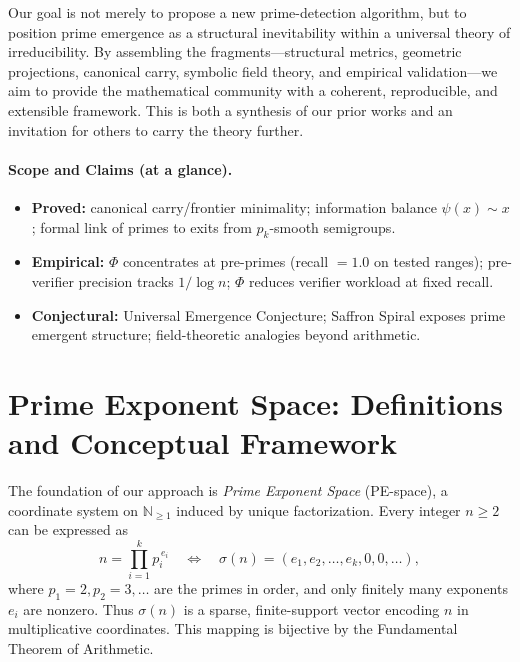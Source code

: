 \documentclass[11pt]{article}
\theoremstyle{plain}
\theoremstyle{definition}
\newcommand{\N}{\mathbb{N}}
\begin{document}
Our goal is not merely to propose a new prime-detection algorithm, but to position prime emergence as a structural inevitability within a universal theory of irreducibility. By assembling the fragments—structural metrics, geometric projections, canonical carry, symbolic field theory, and empirical validation—we aim to provide the mathematical community with a coherent, reproducible, and extensible framework. This is both a synthesis of our prior works and an invitation for others to carry the theory further.

\paragraph{Scope and Claims (at a glance).}
\begin{itemize}[leftmargin=1.5em]
  \item \textbf{Proved:} canonical carry/frontier minimality; information balance $\psi(x)\sim x$; formal link of primes to exits from $p_k$-smooth semigroups.
  \item \textbf{Empirical:} $\Phi$ concentrates at pre-primes (recall $=1.0$ on tested ranges); pre-verifier precision tracks $1/\log n$; $\Phi$ reduces verifier workload at fixed recall.
  \item \textbf{Conjectural:} Universal Emergence Conjecture; Saffron Spiral exposes prime emergent structure; field-theoretic analogies beyond arithmetic.
\end{itemize}

\section{Prime Exponent Space: Definitions and Conceptual Framework}

The foundation of our approach is \emph{Prime Exponent Space} (PE-space), a coordinate system on $\N_{\geq 1}$ induced by unique factorization. Every integer $n \geq 2$ can be expressed as
\[
n = \prod_{i=1}^k p_i^{\,e_i} 
\quad \Longleftrightarrow \quad
\sigma(n) = (e_1, e_2, \ldots, e_k, 0, 0, \ldots),
\]
where $p_1=2, p_2=3, \dots$ are the primes in order, and only finitely many exponents $e_i$ are nonzero. Thus $\sigma(n)$ is a sparse, finite-support vector encoding $n$ in multiplicative coordinates. This mapping is bijective by the Fundamental Theorem of Arithmetic.
\end{document}
